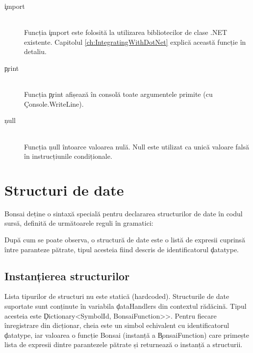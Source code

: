 \documentclass[12pt,a4paper]{memoir}
\begin{document}
\begin{description}
\item[\c{import}]\hfill\\ Funcția \c{import} este folosită la utilizarea bibliotecilor de clase .NET existente. Capitolul \ref{ch:IntegratingWithDotNet} explică această funcție în detaliu.
\item[\c{print}]\hfill\\ Funcția \c{print} afișează în consolă toate argumentele primite (cu\\ \c{Console.WriteLine}).
\item[\c{null}]\hfill\\ Funcția \c{null} întoarce valoarea nulă. Null este utilizat ca unică valoare falsă în instrucțiunile condiționale.
\end{description}

\chapter{Structuri de date}

Bonsai deține o sintaxă specială pentru declararea structurilor de date în codul sursă, definită de următoarele reguli în gramatici:
După cum se poate observa, o structură de date este o listă de expresii cuprinsă între paranteze pătrate, tipul acesteia fiind descris de identificatorul \c{datatype}.

\section{Instanțierea structurilor}

Lista tipurilor de structuri nu este statică (hardcoded). Structurile de date suportate sunt conținute în variabila \c{dataHandlers} din contextul rădăcină. Tipul acesteia este \c{Dictionary<SymbolId, BonsaiFunction>>}. Pentru fiecare înregistrare din dicționar, cheia este un simbol echivalent cu identificatorul \c{datatype}, iar valoarea o funcție Bonsai (instanță a \c{BonsaiFunction}) care primește lista de expresii dintre parantezele pătrate și returnează o instanță a structurii.
\end{document}
